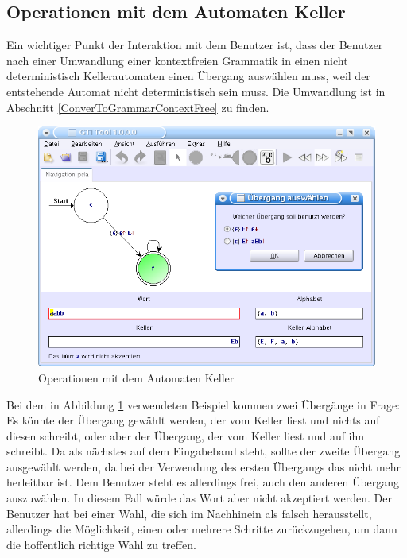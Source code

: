 \subsection{Operationen mit dem Automaten Keller}\label{InteractionPDA}

Ein wichtiger Punkt der Interaktion mit dem Benutzer ist, dass der Benutzer nach
einer Umwandlung einer kontextfreien Grammatik in einen nicht deterministisch
Kellerautomaten einen Übergang auswählen muss, weil der entstehende Automat
nicht deterministisch sein muss. Die Umwandlung ist in Abschnitt
\ref{ConverToGrammarContextFree} zu finden.\vspace{10pt}

\begin{figure}[h!]
\begin{center}
\includegraphics[width=12cm]{../images/grammar_pda.png}
\caption{Operationen mit dem Automaten Keller}
\label{FigureGrammarPDA}
\end{center}
\end{figure}
\vspace{10pt}

Bei dem in Abbildung \ref{FigureGrammarPDA} verwendeten Beispiel kommen zwei
Übergänge in Frage: Es könnte der Übergang gewählt werden, der  vom
Keller liest und nichts auf diesen schreibt, oder aber der Übergang, der
 vom Keller liest und  auf ihn schreibt.
Da  als nächstes auf dem Eingabeband steht, sollte der zweite Übergang
ausgewählt werden, da bei der Verwendung des ersten Übergangs das 
nicht mehr herleitbar ist. Dem Benutzer steht es allerdings frei, auch den
anderen Übergang auszuwählen. In diesem Fall würde das Wort
 aber nicht akzeptiert werden. Der
Benutzer hat bei einer Wahl, die sich im Nachhinein als falsch herausstellt,
allerdings die Möglichkeit, einen oder mehrere Schritte zurückzugehen, um dann
die hoffentlich richtige Wahl zu treffen.\vspace{10pt}


